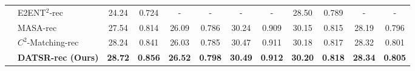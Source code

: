 \documentclass[runningheads]{llncs}
\begin{document}
\begin{table*}[t]
\begin{center}
{\begin{tabular}{|c|l|c|c|c|c|c|c|c|c|c|c|}
  & E2ENT$^{2}$-rec \cite{xie2020feature} & 24.24 & 0.724    & - & -              & - & -              & 28.50 & 0.789   & - & -       \\
  & MASA-rec \cite{lu2021masa}     & 27.54 & 0.814    & 26.09 & 0.786  & 30.24 & 0.909   & 30.15 & 0.815   & 28.19 & 0.796 \\
  & $C^2$-Matching-rec \cite{jiang2021robust} & 28.24 & 0.841    & 26.03 & 0.785   & 30.47 & 0.911   & 30.18 & 0.817   & 28.32 & 0.801 \\
   \cline{2-12}
   & \textbf{DATSR-rec (Ours)}   & \textbf{28.72} & \textbf{0.856}   & \textbf{26.52} & \textbf{0.798}      & \textbf{30.49} & \textbf{0.912} & \textbf{30.20} & \textbf{0.818}   & \textbf{28.34} & \textbf{0.805} \\
\hline
\end{tabular}
}
\end{center}
\label{tab:quan_comp_rec}
\end{table*}
\end{document}
